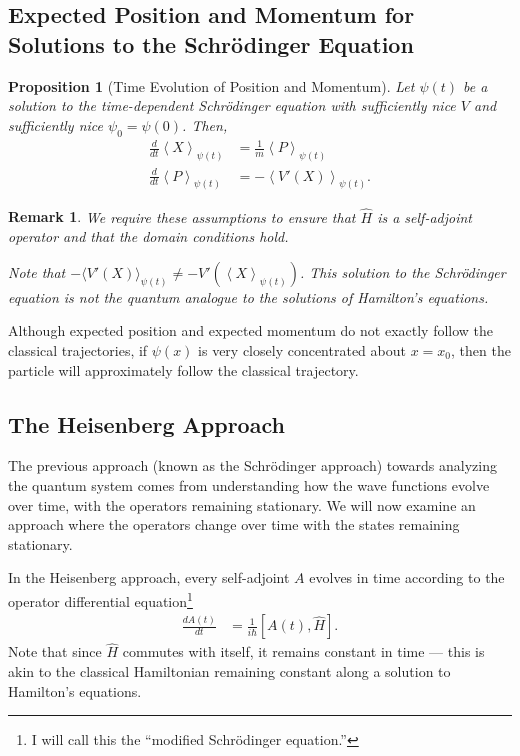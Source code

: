 \documentclass[10pt]{extarticle}
\newtheorem*{remark}{Remark}
\theoremstyle{plain}
\newtheorem*{proposition}{Proposition}%
\theoremstyle{definition}
\theoremstyle{remark}
\renewcommand{\newline}{\hfill\break}
\begin{document}
  \subsection{Expected Position and Momentum for Solutions to the Schrödinger Equation}%
  \begin{proposition}[Time Evolution of Position and Momentum]
    Let $\psi(t)$ be a solution to the time-dependent Schrödinger equation with sufficiently nice $V$ and sufficiently nice $\psi_0 = \psi(0)$. Then,
    \begin{align*}
      \frac{d}{dt}\left\langle X\right\rangle_{\psi(t)} &= \frac{1}{m}\left\langle P\right\rangle_{\psi(t)}\\
      \frac{d}{dt}\left\langle P\right\rangle_{\psi(t)} &= -\left\langle V'(X)\right\rangle_{\psi(t)}.
    \end{align*}
  \end{proposition}
  \begin{remark}
    We require these assumptions to ensure that $\hat{H}$ is a self-adjoint operator and that the domain conditions hold.\newline

    Note that $-\langle V'(X)\rangle_{\psi(t)}\neq -V'\left(\left\langle X\right\rangle_{\psi(t)}\right)$. This solution to the Schrödinger equation is not the quantum analogue to the solutions of Hamilton's equations.
  \end{remark}
  Although expected position and expected momentum do not exactly follow the classical trajectories, if $\psi(x)$ is very closely concentrated about $x = x_0$, then the particle will approximately follow the classical trajectory.
  \subsection{The Heisenberg Approach}%
  The previous approach (known as the Schrödinger approach) towards analyzing the quantum system comes from understanding how the wave functions evolve over time, with the operators remaining stationary. We will now examine an approach where the operators change over time with the states remaining stationary.\newline

  In the Heisenberg approach, every self-adjoint $A$ evolves in time according to the operator differential equation\footnote{I will call this the ``modified Schrödinger equation.''}
  \begin{align*}
    \frac{dA(t)}{dt} &= \frac{1}{i\hbar}[A(t),\hat{H}].
  \end{align*}
  Note that since $\hat{H}$ commutes with itself, it remains constant in time --- this is akin to the classical Hamiltonian remaining constant along a solution to Hamilton's equations.\newline
\end{document}
